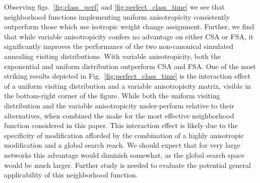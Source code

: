 \documentclass[10pt,journal,cspaper,compsoc]{IEEEtran}
\begin{document}
Observing figs.~\ref{fig:class_perf} and \ref{fig:perfect_class_time} we see that neighborhood functions implementing uniform anisotropicity consistently outperform those which use isotropic weight change assignment. Further, we find that while variable anisotropicity confers no advantage on either CSA or FSA, it significantly improves the performance of the two non-canonical simulated annealing visiting distributions. With variable anisotropicity, both the exponential and uniform distribution outperform CSA and FSA. One of the most striking results depicted in Fig.~\ref{fig:perfect_class_time} is the interaction effect of a uniform visiting distribution and a variable anisotropicity matrix, visible in the bottom-right corner of the figure. While both the uniform visiting distribution and the variable anisotropicity under-perform relative to their alternatives, when combined the make for the most effective neighborhood function considered in this paper. This interaction effect is likely due to the specificity of modification afforded by the combination of a highly anisotropic modification and a global search reach. We should expect that for very large networks this advantage would diminish somewhat, as the global search space would be much larger. Further study is needed to evaluate the potential general applicability of this neighborhood function.
\end{document}
